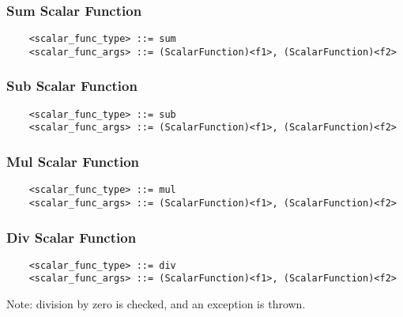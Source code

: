 \subsubsection{Sum Scalar Function}
\begin{verbatim}
    <scalar_func_type> ::= sum
    <scalar_func_args> ::= (ScalarFunction)<f1>, (ScalarFunction)<f2>
\end{verbatim}

\subsubsection{Sub Scalar Function}
\begin{verbatim}
    <scalar_func_type> ::= sub
    <scalar_func_args> ::= (ScalarFunction)<f1>, (ScalarFunction)<f2>
\end{verbatim}

\subsubsection{Mul Scalar Function}
\begin{verbatim}
    <scalar_func_type> ::= mul
    <scalar_func_args> ::= (ScalarFunction)<f1>, (ScalarFunction)<f2>
\end{verbatim}

\subsubsection{Div Scalar Function}
\begin{verbatim}
    <scalar_func_type> ::= div
    <scalar_func_args> ::= (ScalarFunction)<f1>, (ScalarFunction)<f2>
\end{verbatim}
Note: division by zero is checked, and an exception is thrown.

